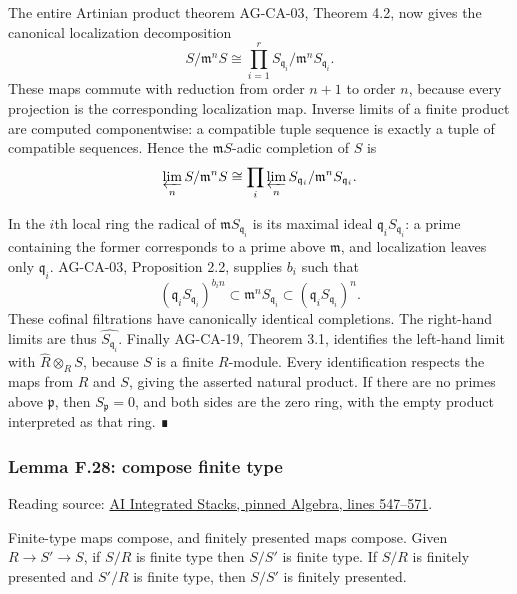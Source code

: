 \documentclass[11pt,a4paper,openany]{report}
\begin{document}
The entire Artinian product theorem AG-CA-03, Theorem 4.2, now gives the canonical localization decomposition \[S/\mathfrak m^nS
\cong\prod_{i=1}^r S_{\mathfrak q_i}/\mathfrak m^nS_{\mathfrak q_i}.\] These maps commute with reduction from order \(n+1\) to order \(n\), because every projection is the corresponding localization map. Inverse limits of a finite product are computed componentwise: a compatible tuple sequence is exactly a tuple of compatible sequences. Hence the \(\mathfrak mS\)-adic completion of \(S\) is \[\varprojlim_n S/\mathfrak m^nS
\cong\prod_i\varprojlim_n
S_{\mathfrak q_i}/\mathfrak m^nS_{\mathfrak q_i}.\]

In the \(i\)th local ring the radical of \(\mathfrak mS_{\mathfrak q_i}\) is its maximal ideal \(\mathfrak q_iS_{\mathfrak q_i}\): a prime containing the former corresponds to a prime above \(\mathfrak m\), and localization leaves only \(\mathfrak q_i\). AG-CA-03, Proposition 2.2, supplies \(b_i\) such that \[(\mathfrak q_iS_{\mathfrak q_i})^{b_in}
\subset\mathfrak m^nS_{\mathfrak q_i}
\subset(\mathfrak q_iS_{\mathfrak q_i})^n.\] These cofinal filtrations have canonically identical completions. The right-hand limits are thus \(\widehat{S_{\mathfrak q_i}}\). Finally AG-CA-19, Theorem 3.1, identifies the left-hand limit with \(\widehat R\otimes_RS\), because \(S\) is a finite \(R\)-module. Every identification respects the maps from \(R\) and \(S\), giving the asserted natural product. If there are no primes above \(\mathfrak p\), then \(S_{\mathfrak p}=0\), and both sides are the zero ring, with the empty product interpreted as that ring. ∎

\label{AG-RG-S05-algebra-lemma-compose-finite-type}

\subsubsection{Lemma F.28: compose finite type}\label{AG-RG-S05-lemma-f.28-compose-finite-type}

Reading source: \href{https://github.com/KokunoYumeto/unofficial-stacks-project-ai-drafts/blob/565b10e987aba5969b21145a0833f42d69f96790/algebra.tex\#L547-L571}{AI Integrated Stacks, pinned Algebra, lines 547--571}.

Finite-type maps compose, and finitely presented maps compose. Given \(R\to S'\to S\), if \(S/R\) is finite type then \(S/S'\) is finite type. If \(S/R\) is finitely presented and \(S'/R\) is finite type, then \(S/S'\) is finitely presented.
\end{document}
